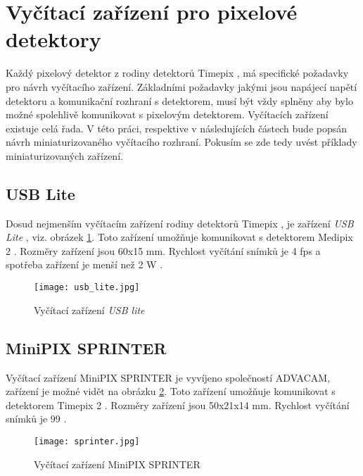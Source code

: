 \section{Vyčítací zařízení pro pixelové detektory}
\label{Vycitaci zarizeni}
Každý pixelový detektor z rodiny detektorů Timepix \cite{Llopart}, má specifické požadavky pro návrh vyčítacího zařízení. Základními požadavky jakými jsou napájecí napětí detektoru a komunikační rozhraní s detektorem, musí být vždy splněny aby bylo možné spolehlivě komunikovat s pixelovým detektorem. Vyčítacích zařízení existuje celá řada. V této práci, respektive v následujících částech bude popsán návrh miniaturizovaného vyčítacího rozhraní. Pokusím se zde tedy uvést příklady miniaturizovaných zařízení.
\subsection{USB Lite}
Dosud nejmenším vyčítacím zařízení rodiny detektorů Timepix \cite{Llopart}, je zařízení \textit{USB Lite} \cite{usb_lite}, viz. obrázek \ref{fig:usb_lite}. Toto zařízení umožňuje komunikovat s detektorem Medipix 2 \cite{Medpix2}. Rozměry zařízení jsou 60x15 mm. Rychlost vyčítání snímků je 4 fps a spotřeba zařízení je menší než 2 W \cite{usb_lite}.
 \begin{figure}[h!]
	\centering
	\captionsetup{justification=centering}
	\texttt{[image: usb\_lite.jpg]}
	\caption{Vyčítací zařízení \textit{USB lite}} 
	\label{fig:usb_lite}
\end{figure}	

\subsection{MiniPIX SPRINTER}
Vyčítací zařízení MiniPIX SPRINTER je vyvíjeno společností ADVACAM, zařízení je možné vidět na obrázku \ref{fig:sprinter}. Toto zařízení umožňuje komunikovat s detektorem Timepix 2 \cite{tpx2_manual}. Rozměry zařízení jsou 50x21x14 mm. Rychlost vyčítání snímků je 99 \cite{Advacam}.
\begin{figure}[h!]
	\centering
	\captionsetup{justification=centering}
	\texttt{[image: sprinter.jpg]}
	\caption{Vyčítací zařízení MiniPIX SPRINTER} 
	\label{fig:sprinter}
\end{figure}	

